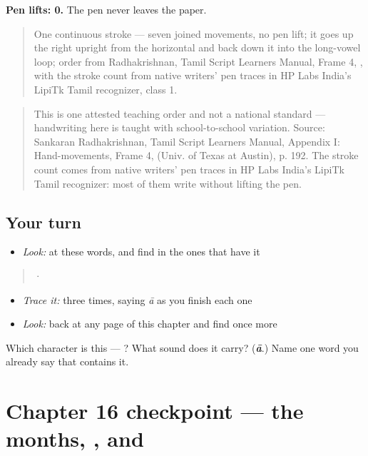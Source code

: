 \textbf{Pen lifts: 0.} The pen never leaves the paper.

\begin{quote}
One continuous stroke — seven joined movements, no pen lift; it goes up the right upright from the horizontal and back down it into the long-vowel loop; order from Radhakrishnan, Tamil Script Learners Manual, Frame 4, , with the stroke count from native writers' pen traces in HP Labs India's LipiTk Tamil recognizer, class 1.
\end{quote}

\begin{quote}
This is one attested teaching order and not a national standard — handwriting here is taught with school-to-school variation. Source: Sankaran Radhakrishnan, Tamil Script Learners Manual, Appendix I: Hand-movements, Frame 4,  (Univ. of Texas at Austin), p. 192. The stroke count comes from native writers' pen traces in HP Labs India's LipiTk Tamil recognizer: most of them write  without lifting the pen.
\end{quote}

\subsection*{Your turn}
\begin{itemize}
\raggedright
  \item \emph{Look:} at these words, and find  in the ones that have it
\end{itemize}

\begin{quote}
  ·  
\end{quote}

\begin{itemize}
\raggedright
  \item \emph{Trace it:}  three times, saying \emph{ā} as you finish each one
  \item \emph{Look:} back at any page of this chapter and find  once more
\end{itemize}

\begin{tcolorbox}[breakable,colback=teal!4,colframe=teal!35!black,title={Before you move on}]
Which character is this — ? What sound does it carry? (\emph{\textbf{ā}}.) Name one word you already say that contains it.
\end{tcolorbox}
\section[Practice]{Chapter 16 checkpoint — the months, ,  and }

